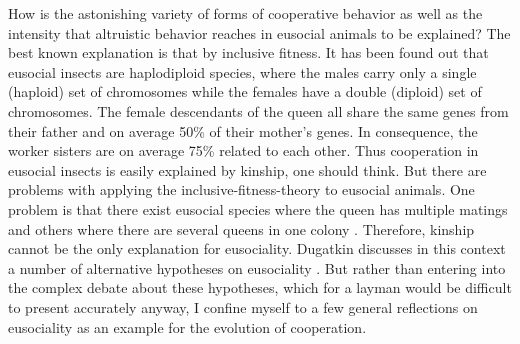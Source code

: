 How is the astonishing variety of forms of cooperative behavior as well as
the intensity that altruistic behavior reaches in eusocial animals to be
explained? The best known explanation is that by inclusive fitness. It has
been found out that eusocial insects are haplodiploid species, where the
males carry only a single (haploid) set of chromosomes while the females have
a double (diploid) set of chromosomes. The female descendants of the queen all
share the same genes from their father and on average 50\% of their mother's
genes. In consequence, the worker sisters are on average 75\% related to each
other. Thus cooperation in eusocial insects is easily explained by kinship,
one should think. But there are problems with applying the
inclusive-fitness-theory to eusocial animals. One problem is that there exist
eusocial species where the queen has multiple matings and others where there
are several queens in one colony \cite[p.\ 144]{dugatkin:1997}. Therefore,
kinship cannot be the only explanation for eusociality. Dugatkin
discusses in this context a number of alternative hypotheses on eusociality
\cite[p.\  144-149]{dugatkin:1997}. But rather than entering into the complex
debate about these hypotheses, which for a layman would be difficult to
present accurately anyway, I confine myself to a few general reflections
on eusociality as an example for the evolution of cooperation.

